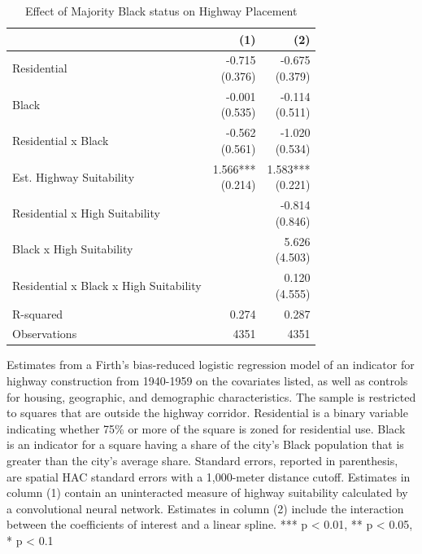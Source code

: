 \begin{table}[h]
\centering
\caption{Effect of Majority Black status on Highway Placement}
\label{tab:results/mblack_mean_pct}
\begin{threeparttable}
\begin{tabular*}{1.0\textwidth}{@{\extracolsep{\fill}}l*{2}{r}}
\toprule
 & (1) & (2) \\
\midrule
Residential & \makecell[tr]{-0.715 \\ (0.376)} & \makecell[tr]{-0.675 \\ (0.379)} \\
Black & \makecell[tr]{-0.001 \\ (0.535)} & \makecell[tr]{-0.114 \\ (0.511)} \\
Residential x Black & \makecell[tr]{-0.562 \\ (0.561)} & \makecell[tr]{-1.020 \\ (0.534)} \\
Est. Highway Suitability & \makecell[tr]{1.566{***} \\ (0.214)} & \makecell[tr]{1.583{***} \\ (0.221)} \\
Residential x High Suitability &  & \makecell[tr]{-0.814 \\ (0.846)} \\
Black x High Suitability &  & \makecell[tr]{5.626 \\ (4.503)} \\
Residential x Black x High Suitability &  & \makecell[tr]{0.120 \\ (4.555)} \\
R-squared & 0.274 & 0.287 \\
Observations & 4351 & 4351 \\
\bottomrule
\end{tabular*}
\begin{tablenotes}[flushleft]
\footnotesize
\item Estimates from a Firth's bias-reduced logistic regression model of an indicator for highway construction from 1940-1959 on the covariates listed, as well as controls for housing, geographic, and demographic characteristics. The sample is restricted to squares that are outside the highway corridor. Residential is a binary variable indicating whether 75\% or more of the square is zoned for residential use. Black is an indicator for a square having a share of the city's Black population that is greater than the city's average share. Standard errors, reported in parenthesis, are \textcite{conley_gmm_1999} spatial HAC standard errors with a 1,000-meter distance cutoff. Estimates in column (1) contain an uninteracted measure of highway suitability calculated by a convolutional neural network. Estimates in column (2) include the interaction between the coefficients of interest and a linear spline. *** p < 0.01, ** p < 0.05, * p < 0.1
\end{tablenotes}
\end{threeparttable}
\end{table}
